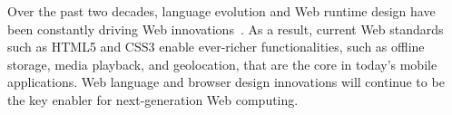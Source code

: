 Over the past two decades, language evolution and Web runtime design have been constantly driving Web  innovations~\cite{webevolution, html5evolution}. As a result, current Web standards such as HTML5 and CSS3 enable ever-richer functionalities, such as offline storage, media playback, and geolocation, that are the core in today's mobile applications. Web language and browser design innovations will continue to be the key enabler for next-generation Web computing.

